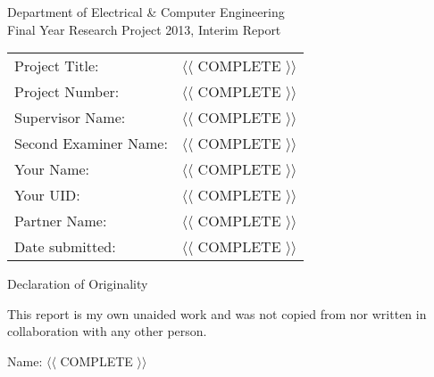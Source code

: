 \begin{titlepage}
\centering
{\Large
Department of Electrical \& Computer Engineering \\
Final Year Research Project 2013, Interim Report}

\hspace{5em}

\begin{table*}[h]
\centering
\begin{tabular}{ll}
Project Title: & $\langle\langle$ COMPLETE $\rangle\rangle$ \\
Project Number: & $\langle\langle$ COMPLETE $\rangle\rangle$ \\
Supervisor Name: & $\langle\langle$ COMPLETE $\rangle\rangle$ \\
Second Examiner Name: & $\langle\langle$ COMPLETE $\rangle\rangle$ \\
Your Name: & $\langle\langle$ COMPLETE $\rangle\rangle$ \\
Your UID: & $\langle\langle$ COMPLETE $\rangle\rangle$ \\
Partner Name: & $\langle\langle$ COMPLETE $\rangle\rangle$  \\
Date submitted: & $\langle\langle$ COMPLETE $\rangle\rangle$ \\

\end{tabular}
\end{table*}
\begin{table}


\end{table}
\pagebreak
{\Large Declaration of Originality}

\hspace{5em}

This report is my own unaided work and was not copied from 
nor written in collaboration with any other person.

Name: $\langle\langle$ COMPLETE $\rangle\rangle$ 


\end{titlepage}


